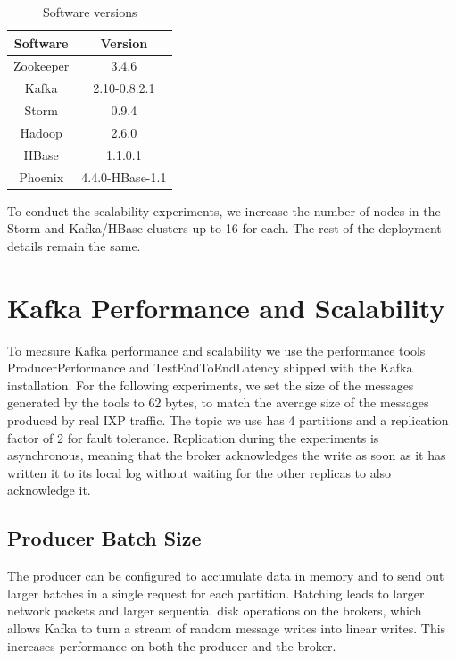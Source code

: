 \begin{table}[H]
\centering
\begin{tabular}{ |c|c| }
\hline
Software & Version \\ \hline \hline
Zookeeper & 3.4.6 \\ \hline
Kafka & 2.10-0.8.2.1 \\ \hline
Storm & 0.9.4 \\ \hline
Hadoop & 2.6.0 \\ \hline
HBase & 1.1.0.1 \\ \hline
Phoenix & 4.4.0-HBase-1.1 \\ \hline
\end{tabular}
\caption{Software versions}
\label{table:benchmarks_cluster_sw_specs}
\end{table}

To conduct the scalability experiments, we increase the number of nodes in the Storm and Kafka/HBase clusters up to 16 for each. The rest of the deployment details remain the same.


\section{Kafka Performance and Scalability}

To measure Kafka performance and scalability we use the performance tools ProducerPerformance and TestEndToEndLatency shipped with the Kafka installation. For the following experiments, we set the size of the messages generated by the tools to 62 bytes, to match the average size of the messages produced by real IXP traffic. The topic we use has 4 partitions and a replication factor of 2 for fault tolerance. Replication during the experiments is asynchronous, meaning that the broker acknowledges the write as soon as it has written it to its local log without waiting for the other replicas to also acknowledge it.

\subsection{Producer Batch Size}

The producer can be configured to accumulate data in memory and to send out larger batches in a single request for each partition. Batching leads to larger network packets and larger sequential disk operations on the brokers, which allows Kafka to turn a stream of random message writes into linear writes. This increases performance on both the producer and the broker. 

